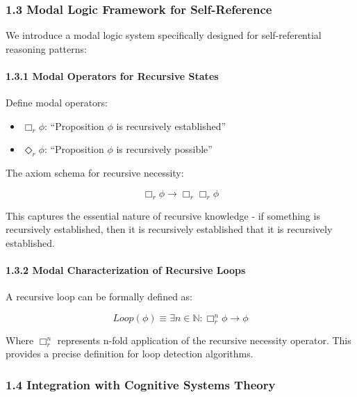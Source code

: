 \documentclass[
]{article}
\providecommand{\tightlist}{%
  \setlength{\itemsep}{0pt}\setlength{\parskip}{0pt}}
\begin{document}
\subsubsection{1.3 Modal Logic Framework for
Self-Reference}\label{modal-logic-framework-for-self-reference}

We introduce a modal logic system specifically designed for
self-referential reasoning patterns:

\paragraph{1.3.1 Modal Operators for Recursive
States}\label{modal-operators-for-recursive-states}

Define modal operators:

\begin{itemize}
\tightlist
\item
  \(\Box_r \phi\): ``Proposition \(\phi\) is recursively established''
\item
  \(\Diamond_r \phi\): ``Proposition \(\phi\) is recursively possible''
\end{itemize}

The axiom schema for recursive necessity:

\[\Box_r \phi \rightarrow \Box_r \Box_r \phi\]

This captures the essential nature of recursive knowledge - if something
is recursively established, then it is recursively established that it
is recursively established.

\paragraph{1.3.2 Modal Characterization of Recursive
Loops}\label{modal-characterization-of-recursive-loops}

A recursive loop can be formally defined as:

\[Loop(\phi) \equiv \exists n \in \mathbb{N}: \Box_r^n \phi \rightarrow \phi\]

Where \(\Box_r^n\) represents n-fold application of the recursive
necessity operator. This provides a precise definition for loop
detection algorithms.

\subsubsection{1.4 Integration with Cognitive Systems
Theory}\label{integration-with-cognitive-systems-theory}
\end{document}
